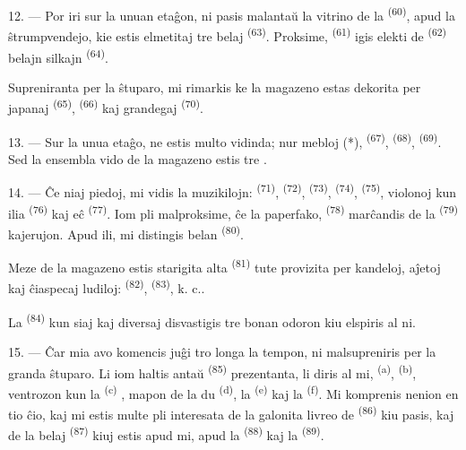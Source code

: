 12. --- Por iri sur la unuan etaĝon, ni pasis malantaŭ la vitrino de la
 \textsuperscript{(60)}, apud la ŝtrumpvendejo, kie estis
elmetitaj tre belaj  \textsuperscript{(63)}. Proksime,
 \textsuperscript{(61)} igis elekti de 
\textsuperscript{(62)} belajn silkajn  \textsuperscript{(64)}.

Supreniranta per la ŝtuparo, mi rimarkis ke la magazeno estas dekorita per
japanaj  \textsuperscript{(65)}, 
\textsuperscript{(66)} kaj grandegaj  \textsuperscript{(70)}.

13. --- Sur la unua etaĝo, ne estis multo vidinda; nur mebloj (*),
 \textsuperscript{(67)}, 
\textsuperscript{(68)},  \textsuperscript{(69)}. Sed la
ensembla vido de la magazeno estis tre .

14. --- Ĉe niaj piedoj, mi vidis la muzikilojn: 
\textsuperscript{(71)},  \textsuperscript{(72)},
 \textsuperscript{(73)}, 
\textsuperscript{(74)},  \textsuperscript{(75)}, violonoj
kun ilia  \textsuperscript{(76)} kaj eĉ 
\textsuperscript{(77)}. Iom pli malproksime, ĉe la paperfako,
 \textsuperscript{(78)} marĉandis de la 
\textsuperscript{(79)} kajerujon. Apud ili, mi distingis belan
 \textsuperscript{(80)}.

Meze de la magazeno estis starigita alta 
\textsuperscript{(81)} tute provizita per kandeloj, aĵetoj kaj ĉiaspecaj
ludiloj:  \textsuperscript{(82)}, 
\textsuperscript{(83)}, k. c..

La  \textsuperscript{(84)} kun siaj 
kaj diversaj  disvastigis tre bonan odoron kiu elspiris al ni.

\VUsaut{3.4mm}
\VUsaut{2.8mm}

15. --- Ĉar mia avo komencis juĝi tro longa la tempon, ni malsupreniris per la
granda ŝtuparo. Li iom haltis antaŭ 
\textsuperscript{(85)} prezentanta, li diris al mi, 
\textsuperscript{(a)},  \textsuperscript{(b)},
ventrozon kun la  \textsuperscript{(c)}
, mapon de la du
 \textsuperscript{(d)}, la 
\textsuperscript{(e)} kaj la  \textsuperscript{(f)}. Mi
komprenis nenion en tio ĉio, kaj mi estis multe pli interesata de la galonita
livreo de  \textsuperscript{(86)} kiu pasis, kaj de la
belaj  \textsuperscript{(87)} kiuj estis apud mi, apud la
 \textsuperscript{(88)} kaj la 
\textsuperscript{(89)}.


